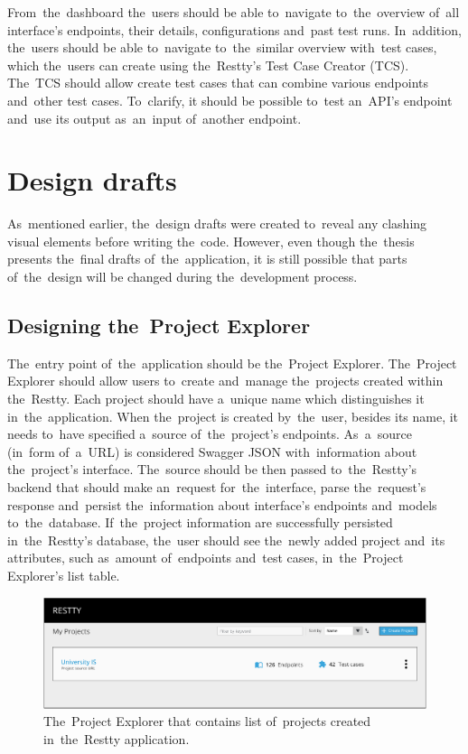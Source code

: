 From~the~dashboard the~users should be able to~navigate to~the~overview of~all
interface's endpoints, their details, configurations and~past test runs.
In~addition, the~users should be able to~navigate to~the~similar overview
with~test cases, which the~users can create using the~Restty's Test Case
Creator (TCS). The~TCS should allow create test cases that can combine various
endpoints and~other test cases. To~clarify, it should be possible to~test
an~API's endpoint and~use its output as~an~input of~another endpoint.

\section{Design drafts}
As~mentioned earlier, the~design drafts were created to~reveal any clashing visual
elements before writing the~code. However, even though the~thesis presents the~final drafts
of~the~application, it is still possible that parts of~the~design will be changed during
the~development process.

\subsection{Designing the~Project Explorer}
The~entry point of~the~application should be the~Project Explorer. The~Project
Explorer should allow users to~create and~manage the~projects created within
the~Restty. Each project should have a~unique name which distinguishes it
in~the~application. When the~project is created by~the~user, besides its name,
it needs to~have specified a~source of~the~project's endpoints. As~a~source
(in~form of~a~URL) is considered Swagger JSON with~information about
the~project's interface. The~source should be then passed to~the~Restty's
backend that should make an~request for~the~interface, parse the~request's
response and~persist the~information about interface's endpoints and~models
to~the~database. If~the~project information are successfully persisted
in~the~Restty's database, the~user should see the~newly added project and~its
attributes, such as~amount of~endpoints and~test cases, in~the~Project
Explorer's list table.

\begin{figure}[!hbt]
	\centering
	\includegraphics[scale=0.55]{./designs/project-explorer.pdf}
	\caption{The~Project Explorer that contains list of~projects created
	in~the~Restty application.}
\end{figure}


